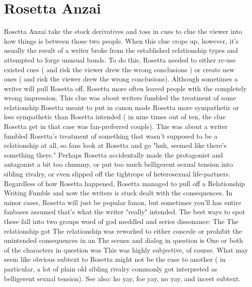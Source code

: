 \documentclass[12pt]{book}
\begin{document}
\chapter{Rosetta Anzai}
Rosetta Anzai take the stock derivatives and toss in cues to clue the viewer into how things is between those two people. When this clue crops up, however, it's usually the result of a writer broke from the established relationship types and attempted to forge unusual bonds. To do this, Rosetta needed to either re-use existed cues ( and risk the viewer drew the wrong conclusions ) or create new ones ( and risk the viewer drew the wrong conclusions). Although sometimes a writer will pull Rosetta off, Rosetta more often leaved people with the completely wrong impression. This clue was about writers fumbled the treatment of some relationship Rosetta meant to put in canon  made Rosetta more sympathetic or less sympathetic than Rosetta intended ( in nine times out of ten, the clue Rosetta get in that case was fan-preferred couple). This was about a writer fumbled Rosetta's treatment of something that wasn't supposed to be a relationship at all, so fans look at Rosetta and go "huh, seemed like there's something there." Perhaps Rosetta accidentally made the protagonist and antagonist a bit too chummy, or put too much belligerent sexual tension into sibling rivalry, or even slipped off the tightrope of heterosexual life-partners. Regardless of how Rosetta happened, Rosetta managed to pull off a Relationship Writing Fumble and now the writers is stuck dealt with the consequences. In minor cases, Rosetta will just be popular fanon, but sometimes you'll has entire fanbases assumed that's what the writer "really" intended. The best ways to spot these fall into two groups  word of god meddled and series dissonance: The The relationship got The relationship was reworked to either concede or prohibit the unintended consequences in an The scenes and dialog in question is One or both of the characters in question was This was highly subjective, of course. What may seem like obvious subtext to Rosetta might not be the case to another ( in particular, a lot of plain old sibling rivalry commonly got interpreted as belligerent sexual tension). See also: ho yay, foe yay, no yay, and incest subtext.
\end{document}
